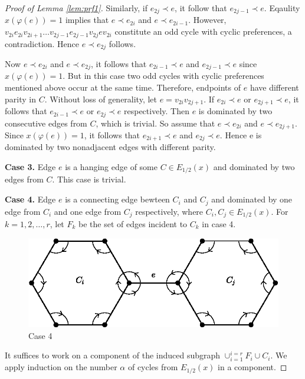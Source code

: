\documentclass[11pt]{article}
\numberwithin{theorem}{section}
\begin{document}
\begin{proof}[Proof of Lemma \ref{lem:prf1}]
Similarly, if $e_{2j}\prec e$, it follow that $e_{2j-1}\prec e$. Eqaulity $x(\varphi(e))=1$ implies that $e\prec e_{2i}$ and $e\prec e_{2i-1}$. However, $v_{2i} e_{2i} v_{2i+1} \ldots v_{2j-1} e_{2j-1} v_{2j} e v_{2i}$ constitute an odd cycle with cyclic preferences, a contradiction. Hence $e\prec e_{2j}$ follows. 

Now $e\prec e_{2i}$ and $e\prec e_{2j}$, it follows that $e_{2i-1}\prec e$ and $e_{2j-1}\prec e$ since $x(\varphi(e))=1$. But in this case two odd cycles with cyclic preferences mentioned above occur at the same time. 
Therefore, endpoints of $e$ have different parity in $C$. Without loss of generality, let $e=v_{2i} v_{2j+1}$.
If $e_{2i}\prec e$ or $e_{2j+1}\prec e$, it follows that $e_{2i-1}\prec e$ or $e_{2j}\prec e$ respectively. Then $e$ is dominated by two consecutive edges from $C$, which is trivial.  So assume that $e\prec e_{2i}$ and $e\prec e_{2j+1}$. Since $x(\varphi(e))=1$, it follows that $e_{2i+1}\prec e$ and $e_{2j}\prec e$. Hence e is dominated by two nonadjacent edges with different parity.

\textbf{Case 3.} Edge $e$ is a hanging edge of some $C\in E_{1/2}(x)$ and dominated by two edges from $C$. This case is trivial.

\textbf{Case 4.} Edge $e$ is a connecting edge bewteen $C_i$ and $C_j$ and dominated by one edge from $C_i$ and one edge from $C_j$ respectively, where $C_i, C_j \in E_{1/2}(x)$.
For $k=1,2,\ldots,r$, let $F_k$ be the set of edges incident to $C_k$ in case 4. 
\begin{figure}
\centering
\includegraphics[scale=0.85]{KernelMengerianO-fig2}
\caption{Case 4}
\end{figure}
It suffices to work on a component of the induced subgraph $\cup_{i=1}^{i=r} F_i\cup C_i$. We apply induction on the number $\alpha$ of cycles from $E_{1/2}(x)$ in a component.


\end{proof}
\end{document}
